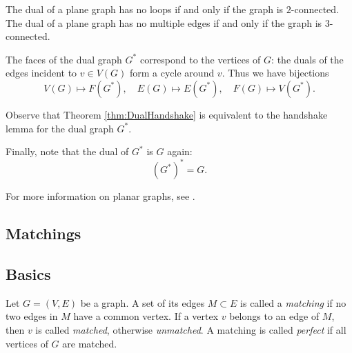 \begin{page}

\begin{lem}
The dual of a plane graph has no loops if and only if the graph is $2$-connected.
The dual of a plane graph has no multiple edges if and only if the graph is $3$-connected.
\end{lem}

\end{page}

\begin{page}


The faces of the dual graph $G^*$ correspond to the vertices of $G$:
the duals of the edges incident to $v \in V(G)$ form a cycle around $v$.
Thus we have bijections
\[
V(G) \mapsto F(G^*), \quad E(G) \mapsto E(G^*), \quad F(G) \mapsto V(G^*).
\]

Observe that Theorem \ref{thm:DualHandshake} is equivalent to the handshake lemma for the dual graph $G^*$.

Finally, note that the dual of $G^*$ is $G$ again:
\[
(G^*)^* = G.
\]

\bigskip

For more information on planar graphs, see \cite[Chapter 10]{BM}.





\end{page}

\begin{page}

\section{Matchings}
\subsection{Basics}

\end{page}

\begin{page}

\begin{dfn}
Let $G = (V, E)$ be a graph.
A set of its edges $M \subset E$ is called a \emph{matching} if no two edges in $M$ have a common vertex.
If a vertex $v$ belongs to an edge of $M$, then $v$ is called \emph{matched}, otherwise \emph{unmatched}.
A matching is called \emph{perfect} if all vertices of $G$ are matched.
\end{dfn}

\end{page}

